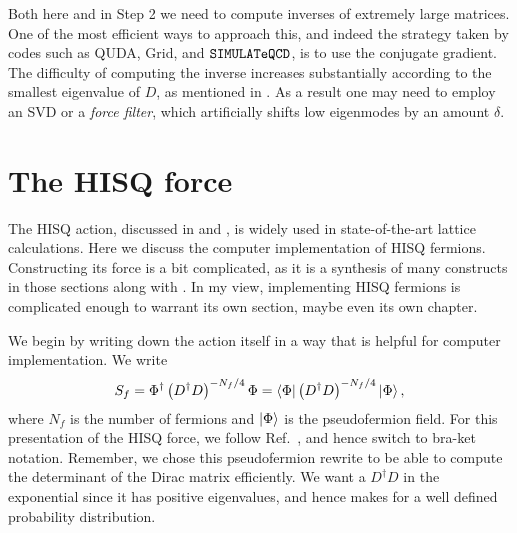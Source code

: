 Both here and in Step 2 we need to compute inverses of extremely
large matrices. One of the most efficient ways to approach this,
and indeed the strategy taken by codes such as 
QUDA, 
Grid, and
$\texttt{SIMULATeQCD}$, is to use the conjugate gradient.
The difficulty of computing the inverse increases
substantially according to the smallest eigenvalue of $D$,
as mentioned in . As a result
one may need to employ an SVD or a
{\it force filter}, which artificially
shifts low eigenmodes by an amount $\delta$.

\section{The HISQ force}\label{sec:HISQforce}

The HISQ action, discussed in  and ,
is widely used in state-of-the-art lattice calculations. 
Here we discuss the computer implementation of HISQ fermions. 
Constructing its
force is a bit complicated, as it is a synthesis of many constructs in
those sections along with . In my view,
implementing HISQ fermions is complicated enough to warrant its own section,
maybe even its own chapter.

We begin by writing down the action itself in a way that is helpful
for computer implementation. We write
\begin{equation}
S_f=\Phi^\dagger\left(D^\dagger D\right)^{-N_f/4}\Phi
=\bra{\Phi}\left(D^{\dagger} D\right)^{-N_f/4}\ket{\Phi},
\end{equation}
where $N_f$ is the number of fermions and $\ket\Phi$ is the pseudofermion field.
For this presentation of the HISQ force, we follow
Ref.~\cite{Wong:2007uz}, and hence switch to bra-ket notation.
Remember, we chose this pseudofermion rewrite to be able to compute the
determinant of the Dirac matrix efficiently. We want a
$D^\dagger D$ in the exponential since it has positive eigenvalues,
and hence makes for a well defined probability distribution.


